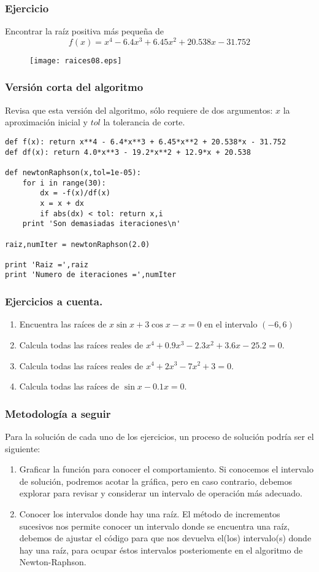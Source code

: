 \begin{frame}
\frametitle{Ejercicio}
Encontrar la raíz positiva más pequeña de
\[ f(x) = x^{4} - 6.4 x^{3} + 6.45x^{2} + 20.538x - 31.752\]
\begin{figure}
	\centering
	 {\texttt{[image: raices08.eps]}}
\end{figure}
\end{frame}
\begin{frame}[fragile]
\frametitle{Versión corta del algoritmo}
Revisa que esta versión del algoritmo, sólo requiere de dos argumentos: $x$ la aproximación inicial y $tol$ la tolerancia de corte.
\begin{lstlisting}
def f(x): return x**4 - 6.4*x**3 + 6.45*x**2 + 20.538*x - 31.752
def df(x): return 4.0*x**3 - 19.2*x**2 + 12.9*x + 20.538

def newtonRaphson(x,tol=1e-05):
    for i in range(30):
        dx = -f(x)/df(x)
        x = x + dx
        if abs(dx) < tol: return x,i
    print 'Son demasiadas iteraciones\n'

raiz,numIter = newtonRaphson(2.0)

print 'Raiz =',raiz
print 'Numero de iteraciones =',numIter
\end{lstlisting}
\end{frame}
\begin{frame}
\frametitle{Ejercicios a cuenta.}
\begin{enumerate}
\item Encuentra las raíces de $x \sin x + 3 \cos x - x = 0$ en el intervalo $(-6,6)$ \\
\item Calcula todas las raíces reales de $x^{4} + 0.9x^{3} - 2.3x^{2} + 3.6x - 25.2 = 0$. \\
\item Calcula todas las raíces reales de $x^{4} + 2x^{3} - 7x^{2} + 3 = 0$. \\
\item Calcula todas las raíces de $\sin x - 0.1x = 0$.
\end{enumerate}
\end{frame}
\begin{frame}
\frametitle{Metodología a seguir}
Para la solución de cada uno de los ejercicios, un proceso de solución podría ser el siguiente:
\begin{enumerate}
\item Graficar la función para conocer el comportamiento. Si conocemos el intervalo de solución, podremos acotar la gráfica, pero en caso contrario, debemos explorar para revisar y considerar un intervalo de operación más adecuado.
\item Conocer los intervalos donde hay una raíz. El método de incrementos sucesivos nos permite conocer un intervalo donde se encuentra una raíz, debemos de ajustar el código para que nos devuelva el(los) intervalo(s) donde hay una raíz, para ocupar éstos intervalos posteriomente en el algoritmo de Newton-Raphson.
\end{enumerate}
\end{frame}
